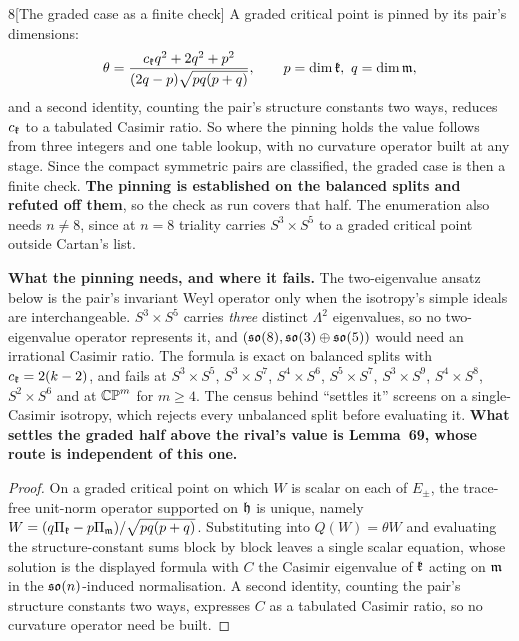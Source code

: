 \begin{Conj}{8}[The graded case as a finite check]
A graded critical point is pinned by its pair's dimensions:
\[
\theta=\frac{c_{\mathfrak{k}}q^2+2q^2+p^2}{(2q-p)\sqrt{pq(p+q)}},\qquad p=\dim\mathfrak{k},\ q=\dim\mathfrak{m},
\]
and a second identity, counting the pair's structure constants two ways, reduces $c_{\mathfrak{k}}$ to a tabulated Casimir ratio. So where the pinning holds the value follows from three integers and one table lookup, with no curvature operator built at any stage. Since the compact symmetric pairs are classified, the graded case is then a finite check. \textbf{The pinning is established on the balanced splits and refuted off them}, so the check as run covers that half. The enumeration also needs $n\ne8$, since at $n=8$ triality carries $S^3\times S^5$ to a graded critical point outside Cartan's list.
\end{Conj}

\begin{remarkstar}
\textbf{What the pinning needs, and where it fails.} The two-eigenvalue ansatz below is the pair's invariant Weyl operator only when the isotropy's simple ideals are interchangeable. $S^3\times S^5$ carries \emph{three} distinct $\Lambda^2$ eigenvalues, so no two-eigenvalue operator represents it, and $(\mathfrak{so}(8),\mathfrak{so}(3)\oplus\mathfrak{so}(5))$ would need an irrational Casimir ratio. The formula is exact on balanced splits with $c_{\mathfrak{k}}=2(k-2)$, and fails at $S^3\times S^5$, $S^3\times S^7$, $S^4\times S^6$, $S^5\times S^7$, $S^3\times S^9$, $S^4\times S^8$, $S^2\times S^6$ and at $\mathbb{CP}^m$ for $m\ge4$. The census behind ``settles it'' screens on a single-Casimir isotropy, which rejects every unbalanced split before evaluating it. \textbf{What settles the graded half above the rival's value is Lemma~69, whose route is independent of this one.}
\end{remarkstar}

\begin{proof}
On a graded critical point on which $W$ is scalar on each of $E_\pm$, the trace-free unit-norm operator supported on $\mathfrak{h}$ is unique, namely $W=(q\Pi_{\mathfrak{k}}-p\Pi_{\mathfrak{m}})/\sqrt{pq(p+q)}$. Substituting into $Q(W)=\theta W$ and evaluating the structure-constant sums block by block leaves a single scalar equation, whose solution is the displayed formula with $C$ the Casimir eigenvalue of $\mathfrak{k}$ acting on $\mathfrak{m}$ in the $\mathfrak{so}(n)$-induced normalisation. A second identity, counting the pair's structure constants two ways, expresses $C$ as a tabulated Casimir ratio, so no curvature operator need be built.
\end{proof}


